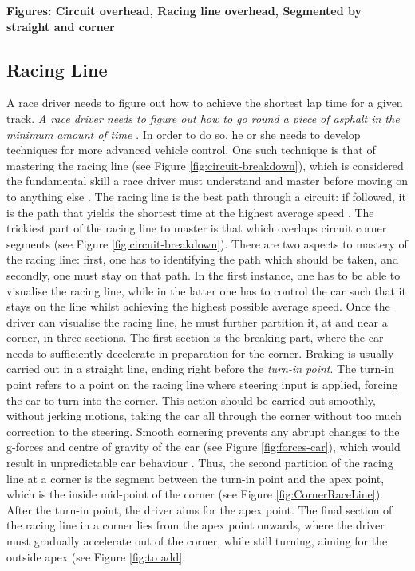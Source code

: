 \textbf{Figures: Circuit overhead, Racing line overhead, Segmented by straight and corner}

\subsection{Racing Line}
A race driver needs to figure out how to achieve the shortest lap time for a given track.
\emph{A race driver needs to figure out how to go round a piece of asphalt in the minimum amount of time} \cite{GoingFaster}. In order to do so, he or she needs to develop techniques for more advanced vehicle control. One such technique is that of mastering the racing line (see Figure \ref{fig:circuit-breakdown}), which is considered the fundamental skill a race driver must understand and master before moving on to anything else \cite{GoingFaster}. The racing line is the best path through a circuit: if followed, it is the path that yields the shortest time at the highest average speed \cite{beckman1991physics}. The trickiest part of the racing line to master is that which overlaps circuit corner segments (see Figure \ref{fig:circuit-breakdown}). There are two aspects to mastery of the racing line: first, one has to identifying the path which should be taken, and secondly, one must stay on that path. In the first instance, one has to be able to visualise the racing line, while in the latter one has to control the car such that it stays on the line whilst achieving the highest possible average speed. Once the driver can visualise the racing line, he must further partition it, at and near a corner, in three sections. The first section is the breaking part, where the car needs to sufficiently decelerate in preparation for the corner. Braking is usually carried out in a straight line, ending right before the \emph{turn-in point}. The turn-in point refers to a point on the racing line where steering input is applied, forcing the car to turn into the corner. This action should be carried out smoothly, without jerking motions, taking the car all through the corner without too much correction to the steering. Smooth cornering prevents any abrupt changes to the g-forces and centre of gravity of the car (see Figure \ref{fig:forces-car}), which would result in unpredictable car behaviour \cite{GoingFaster}. Thus, the second partition of the racing line at a corner is the segment between the turn-in point and the apex point, which is the inside mid-point of the corner (see Figure \ref{fig:CornerRaceLine}). After the turn-in point, the driver aims for the apex point. The final section of the racing line in a corner lies from the apex point onwards, where the driver must gradually accelerate out of the corner, while still turning, aiming for the outside apex (see Figure \ref{fig:to add}.

